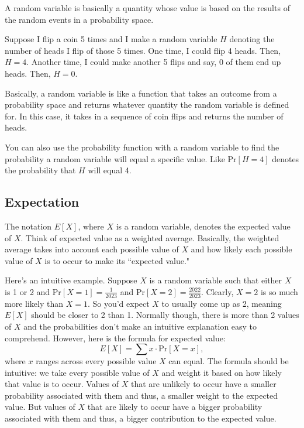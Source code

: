\documentclass[11pt]{scrartcl}
\begin{document}
A random variable is basically a quantity whose value is based on the results of the random events in a probability space.

Suppose I flip a coin 5 times and I make a random variable $H$ denoting the number of heads I flip of those 5 times. One time, I could flip 4 heads. Then, $H = 4$. Another time, I could make another 5 flips and say, 0 of them end up heads. Then, $H = 0$.

Basically, a random variable is like a function that takes an outcome from a probability space and returns whatever quantity the random variable is defined for. In this case, it takes in a sequence of coin flips and returns the number of heads.

You can also use the probability function with a random variable to find the probability a random variable will equal a specific value. Like $\text{Pr}[H = 4]$ denotes the probability that $H$ will equal 4.

\subsection{Expectation}

The notation $E[X]$, where $X$ is a random variable, denotes the expected value of $X$. Think of expected value as a weighted average. Basically, the weighted average takes into account each possible value of $X$ and how likely each possible value of $X$ is to occur to make its ``expected value."

Here's an intuitive example. Suppose $X$ is a random variable such that either $X$ is 1 or 2 and $\text{Pr}[X = 1] = \frac{1}{2023}$ and $\text{Pr}[X = 2] = \frac{2022}{2023}$. Clearly, $X = 2$ is so much more likely than $X = 1$. So you'd expect $X$ to usually come up as 2, meaning $E[X]$ should be closer to 2 than 1. Normally though, there is more than 2 values of $X$ and the probabilities don't make an intuitive explanation easy to comprehend. However, here is the formula for expected value: \[E[X] = \sum x \cdot \text{Pr}[X = x],\] where $x$ ranges across every possible value $X$ can equal. The formula should be intuitive: we take every possible value of $X$ and weight it based on how likely that value is to occur. Values of $X$ that are unlikely to occur have a smaller probability associated with them and thus, a smaller weight to the expected value. But values of $X$ that are likely to occur have a bigger probability associated with them and thus, a bigger contribution to the expected value.
\end{document}
